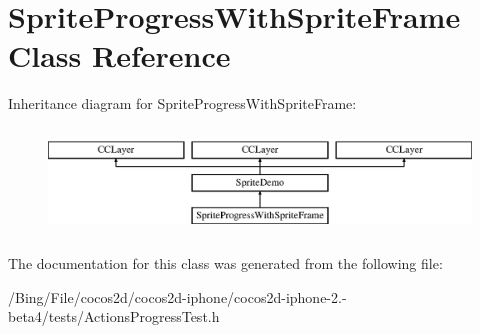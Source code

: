 \hypertarget{interface_sprite_progress_with_sprite_frame}{\section{Sprite\-Progress\-With\-Sprite\-Frame Class Reference}
\label{interface_sprite_progress_with_sprite_frame}
}
Inheritance diagram for Sprite\-Progress\-With\-Sprite\-Frame\-:\begin{figure}[H]
\begin{center}
\leavevmode
\includegraphics[height=2.842640cm]{interface_sprite_progress_with_sprite_frame}
\end{center}
\end{figure}


The documentation for this class was generated from the following file\-:\begin{DoxyCompactItemize}
\item 
/\-Bing/\-File/cocos2d/cocos2d-\/iphone/cocos2d-\/iphone-\/2.-\/beta4/tests/Actions\-Progress\-Test.\-h\end{DoxyCompactItemize}
